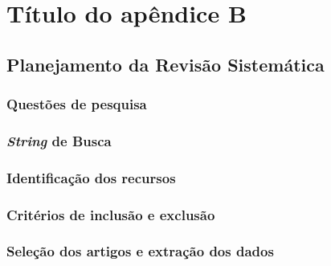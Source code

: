 \chapter{Título do apêndice B}
\label{apendice_b}



\section{Planejamento da Revisão Sistemática}
\label{s_apendiceB_planejamento}

\subsection{Questões de pesquisa}
\label{ss_apendiceB_objetivos}



\subsection{\textit{String} de Busca}
\label{ss_apendiceB_protocolo-busca}



\subsection{Identificação dos recursos}
\label{ss_apendiceB_id-recursos}




\subsection{Critérios de inclusão e exclusão}
\label{ss_apendiceB_criterios}





\subsection{Seleção dos artigos e extração dos dados}
\label{ss_apendiceB_extraction}





